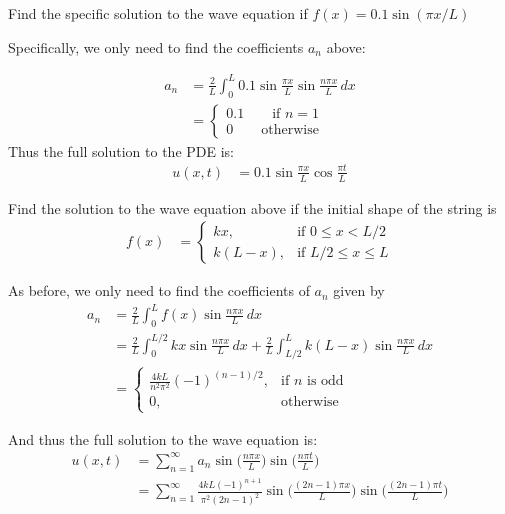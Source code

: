 \begin{example}
Find the specific solution to the wave equation if $f(x) = 0.1 \sin (\pi x/L)$

\solution

Specifically, we only need to find the coefficients $a_n$ above:

\begin{align*}
a_n & = \frac{2}{L} \int_0^L 0.1 \sin \frac{\pi x}{L}  \sin \frac{n\pi x}{L}  \, dx \\
& = \begin{cases}
0.1 \qquad \text{if $n=1$} \\
0 \qquad \text{otherwise}
\end{cases}
\end{align*}
Thus the full solution to the PDE is:
%
\begin{align*}
u(x,t) & = 0.1 \sin \frac{\pi x}{L} \cos \frac{\pi t}{L}
\end{align*}
\end{example}


\begin{example}
Find the solution to the wave equation above if the initial shape of the string is
%
\begin{align*}
f(x) & = \begin{cases}
kx,&  \text{if $0\leq x< L/2$} \\
k(L-x),& \text{if $L/2 \leq x \leq L$}
\end{cases}
\end{align*}

As before, we only need to find the coefficients of $a_n$ given by
%
\begin{align*}
a_n & = \frac{2}{L} \int_0^L  f(x)  \sin \frac{n \pi x}{L} \, dx \\
& = \frac{2}{L} \int_0^{L/2} kx \sin \frac{n \pi x}{L} \, dx + \frac{2}{L} \int_{L/2}^L k(L-x) \sin \frac{n \pi x}{L} \, dx \\
& = \begin{cases}
\frac{4k L}{n^2 \pi^2} (-1)^{(n-1)/2} , & \text{if $n$ is odd} \\
0, & \text{otherwise}
\end{cases}
\end{align*}

And thus the full solution to the wave equation is:
%
\begin{align*}
u(x,t) & = \sum_{n=1}^{\infty}a_n \sin \biggl(\frac{n \pi x}{L} \biggr) \sin \biggl(\frac{n \pi t}{L} \biggr)  \\
& = \sum_{n=1}^{\infty} \frac{4 k L (-1)^{n+1}}{\pi^2 (2n-1)^2} \sin \biggl( \frac{(2n-1) \pi x}{L} \biggr)   \sin \biggl(\frac{(2n-1) \pi t}{L} \biggr)
\end{align*}
\end{example}

